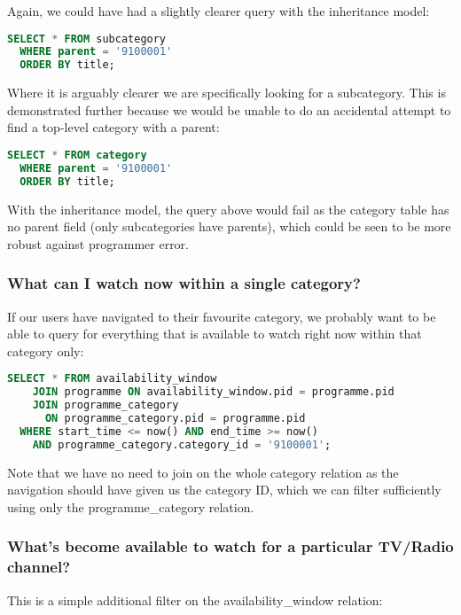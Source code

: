 \documentclass[11pt,a4paper]{article}
\begin{document}
Again, we could have had a slightly clearer query with the inheritance
model:

\begin{lstlisting}[language=SQL]
  SELECT * FROM subcategory
  WHERE parent = '9100001'
  ORDER BY title;
\end{lstlisting}

Where it is arguably clearer we are specifically looking for a subcategory.
This is demonstrated further because we would be unable to do an accidental
attempt to find a top-level category with a parent:

\begin{lstlisting}[language=SQL]
  SELECT * FROM category
  WHERE parent = '9100001'
  ORDER BY title;
\end{lstlisting}

With the inheritance model, the query above would fail as the category
table has no parent field (only subcategories have parents), which
could be seen to be more robust against programmer error.

\subsubsection{What can I watch now within a single category?}

If our users have navigated to their favourite category, we probably want
to be able to query for everything that is available to watch right
now within that category only:

\begin{lstlisting}[language=SQL]
  SELECT * FROM availability_window
    JOIN programme ON availability_window.pid = programme.pid
    JOIN programme_category
      ON programme_category.pid = programme.pid
  WHERE start_time <= now() AND end_time >= now()
    AND programme_category.category_id = '9100001';
\end{lstlisting}

Note that we have no need to join on the whole category relation as the
navigation should have given us the category ID, which we can filter
sufficiently using only the programme\_category relation.

\subsubsection{What's become available to watch for a particular TV/Radio channel?}

This is a simple additional filter on the availability\_window relation:
\end{document}
